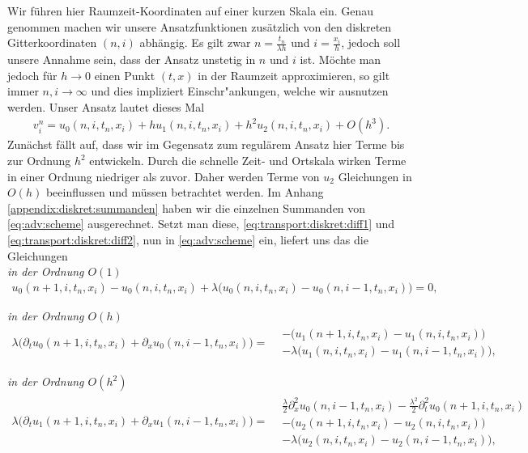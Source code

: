 
Wir führen hier Raumzeit-Koordinaten auf einer kurzen Skala ein.
Genau genommen machen wir unsere Ansatzfunktionen zusätzlich von den diskreten Gitterkoordinaten $(n,i)$ abhängig.
Es gilt zwar $n = \frac {t_n} {\lambda h}$ und $i = \frac {x_i}{h}$, jedoch soll unsere Annahme sein, dass der Ansatz unstetig in $n$ und $i$ ist.
Möchte man jedoch für $h \to 0$ einen Punkt $(t,x)$ in der Raumzeit approximieren, so gilt immer $n,i \to \infty$ und dies impliziert Einschr"ankungen, welche wir ausnutzen werden.
Unser Ansatz lautet dieses Mal
\begin{align}\label{eq:transport:diskret:ansatz}
v^n_i = u_0(n, i, t_n, x_i) + h u_1(n, i, t_n, x_i) + h^2 u_2(n, i, t_n, x_i) + O(h^3).
\end{align}
Zunächst fällt auf, dass wir im Gegensatz zum regulärem Ansatz hier Terme bis zur Ordnung $h^2$ entwickeln.
Durch die schnelle Zeit- und Ortskala wirken Terme in einer Ordnung niedriger als zuvor.
Daher werden Terme von $u_2$ Gleichungen in $O(h)$ beeinflussen und müssen betrachtet werden.
Im Anhang \ref{appendix:diskret:summanden} haben wir die einzelnen Summanden von \eqref{eq:adv:scheme} ausgerechnet.
Setzt man diese, \eqref{eq:transport:diskret:diff1} und \eqref{eq:transport:diskret:diff2}, nun in \eqref{eq:adv:scheme} ein, liefert uns das die Gleichungen
\\

\noindent \emph{in der Ordnung $O(1)$}
\begin{align}\label{eq:transport:diskret:o1}
u_0(n+1, i, t_n, x_i) - u_0(n, i, t_n, x_i)
+ \lambda \bigl(u_0(n, i, t_n, x_i) - u_0(n, i-1, t_n, x_i) \bigr) = 0,
\end{align}

\noindent \emph{in der Ordnung $O(h)$}
\begin{align}\label{eq:transport:diskret:oh}
\lambda \bigl( \partial_t u_0(n+1, i, t_n, x_i) + \partial_x u_0(n, i-1, t_n, x_i) \bigr) =
\begin{split}
&- \bigl( u_1(n+1, i, t_n, x_i) - u_1(n, i, t_n, x_i) \bigr)\\
&- \lambda \bigl(u_1(n, i, t_n, x_i) - u_1(n, i-1, t_n, x_i) \bigr),
\end{split}
\end{align}

\noindent \emph{in der Ordnung $O(h^2)$}
\begin{align}\label{eq:transport:diskret:oh2}
\lambda \bigl( \partial_t u_1(n+1, i, t_n, x_i) + \partial_x u_1(n, i-1, t_n, x_i) \bigr) =
\begin{split}
&\frac {\lambda}{2} \partial^2_x u_0(n, i-1, t_n, x_i) - \frac{\lambda^2}{2} \partial^2_t u_0(n+1, i, t_n, x_i)\\
&- \bigl( u_2(n+1, i, t_n, x_i) - u_2(n, i, t_n, x_i) \bigr)\\
&- \lambda \bigl(u_2(n, i, t_n, x_i) - u_2(n, i-1, t_n, x_i) \bigr),
\end{split}
\end{align}

